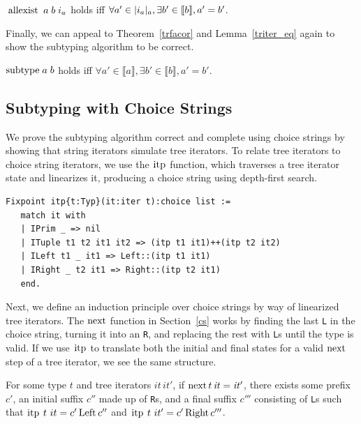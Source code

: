 \documentclass[a4paper,english]{lipics-v2019}
\newcommand{\denotes}[1]{\llbracket #1 \rrbracket}
\renewcommand{\L}{{\tt L}\xspace}
\newcommand{\Ls}{{\tt L}s\xspace}
\newcommand{\R}{{\tt R}\xspace}
\newcommand{\Rs}{{\tt R}s\xspace}
\renewcommand{\c}[1]{\ensuremath{\text{\lstinline{#1}}}\xspace}
\begin{document}
\begin{theorem}\label{trfacor}
$\c{allexist}\;a\;b\;i_a$ holds iff $\forall a'\in \irch{i_a}{a},
  \exists b'\in \denotes{b}, a'= b'$.
\end{theorem}

\noindent
Finally, we can appeal to Theorem~\ref{trfacor} and Lemma~\ref{triter_eq}
again to show the subtyping algorithm to be correct.

\begin{theorem}
$\c{subtype}\;a\;b$ holds iff $\forall a' \in \denotes{a}, \exists b' \in
  \denotes{b}, a' = b'$.
\end{theorem}

\subsection{Subtyping with Choice Strings}

We prove the subtyping algorithm correct and complete using choice strings by
showing that string iterators simulate tree iterators.  To relate tree
iterators to choice string iterators, we use the \c{itp} function, which
traverses a tree iterator state and linearizes it, producing a choice string
using depth-first search.


\begin{lstlisting}
Fixpoint itp{t:Typ}(it:iter t):choice list :=
   match it with
   | IPrim _ => nil
   | ITuple t1 t2 it1 it2 => (itp t1 it1)++(itp t2 it2)
   | ILeft t1 _ it1 => Left::(itp t1 it1)
   | IRight _ t2 it1 => Right::(itp t2 it1)
   end.
\end{lstlisting}

\noindent Next, we define an induction principle over choice strings by way of
linearized tree iterators. The \c{next} function in Section~\ref{cs} works by
finding the last \L in the choice string, turning it into an \R, and replacing
the rest with \Ls until the type is valid. If we use \c{itp} to translate
both the initial and final states for a valid \c{next} step of a tree
iterator, we see the same structure.

\begin{lemma}
\label{lem:snt}
For some type $t$ and tree iterators $\mathit{it}\,\mathit{it}'$, if
$\c{next}\,t\,\mathit{it}=\mathit{it'}$, there exists some prefix  $c'$, an
initial suffix $c''$ made up of \Rs, and a final suffix  $c'''$
consisting of \Ls such that $\c{itp}~t~it=c'\,\c{Left}\,c''$ and 
$\c{itp}~t~it'=c'\,\c{Right}\,c'''$.
\end{lemma}
\end{document}
